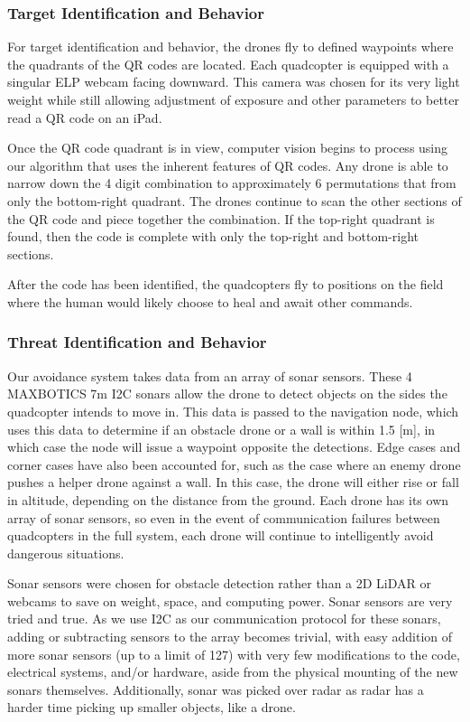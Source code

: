 \documentclass[12pt,letterpaper]{article}
\begin{document}
		\subsubsection*{Target Identification and Behavior}
			For target identification and behavior, the drones fly to defined waypoints where the quadrants of the QR codes are located. Each quadcopter is equipped with a singular ELP webcam facing downward. This camera was chosen for its very light weight while still allowing adjustment of exposure and other parameters to better read a QR code on an iPad.

			Once the QR code quadrant is in view, computer vision begins to process using our algorithm that uses the inherent features of QR codes. Any drone is able to narrow down the 4 digit combination to approximately 6 permutations that from only the bottom-right quadrant. The drones continue to scan the other sections of the QR code and piece together the combination. If the top-right quadrant is found, then the code is complete with only the top-right and bottom-right sections.

			After the code has been identified, the quadcopters fly to positions on the field where the human would likely choose to heal and await other commands.

		\subsubsection*{Threat Identification and Behavior}
			Our avoidance system takes data from an array of sonar sensors. These 4 MAXBOTICS 7m I2C sonars allow the drone to detect objects on the sides the quadcopter intends to move in. This data is passed to the navigation node, which uses this data to determine if an obstacle drone or a wall is within 1.5 [m], in which case the node will issue a waypoint opposite the detections. Edge cases and corner cases have also been accounted for, such as the case where an enemy drone pushes a helper drone against a wall. In this case, the drone will either rise or fall in altitude, depending on the distance from the ground. Each drone has its own array of sonar sensors, so even in the event of communication failures between quadcopters in the full system, each drone will continue to intelligently avoid dangerous situations.

			Sonar sensors were chosen for obstacle detection rather than a 2D LiDAR or webcams to save on weight, space, and computing power. Sonar sensors are very tried and true. As we use I2C as our communication protocol for these sonars, adding or subtracting sensors to the array becomes trivial, with easy addition of more sonar sensors (up to a limit of 127) with very few modifications to the code, electrical systems, and/or hardware, aside from the physical mounting of the new sonars themselves. Additionally, sonar was picked over radar as radar has a harder time picking up smaller objects, like a drone.
\end{document}
